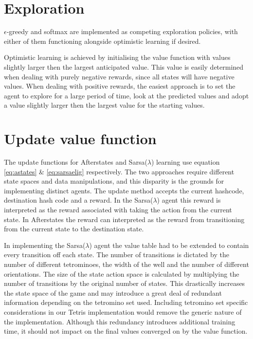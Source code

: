 \documentclass{rucsthesis}
\begin{document}
\section{Exploration}

$\epsilon$-greedy and softmax are implemented as competing exploration policies, with either of them functioning alongside optimistic learning if desired. 

Optimistic learning is achieved by initialising the value function with values slightly larger then the largest anticipated value. This value is easily determined when dealing with purely negative rewards, since all states will have negative values. When dealing with positive rewards, the easiest approach is to set the agent to explore for a large period of time, look at the predicted values and adopt a value slightly larger then the largest value for the starting values.

\section{Update value function}

The update functions for Afterstates and Sarsa($\lambda$) learning use equation \ref{eq:astates} \& \ref{eq:sarsaelig} respectively. The two approaches require different state spaces and data manipulations, and this disparity is the grounds for implementing distinct agents. The update method accepts the current hashcode, destination hash code and a reward. In the Sarsa($\lambda$) agent this reward is interpreted as the reward associated with taking the action from the current state. In Afterstates the reward can interpreted as the reward from transitioning from the current state to the destination state. 

In implementing the Sarsa($\lambda$) agent the value table had to be extended to contain every transition off each state. The number of transitions is dictated by the number of different tetrominoes, the width of the well and the number of different orientations.  The size of the state action space is calculated by multiplying the number of transitions by the original number of states. This drastically increases the state space of the game and may introduce a great deal of redundant information depending on the tetromino set used. Including tetromino set specific considerations in our Tetris implementation would remove the generic nature of the implementation. Although this redundancy introduces additional training time, it should not impact on the final values converged on by the value function.
\end{document}
